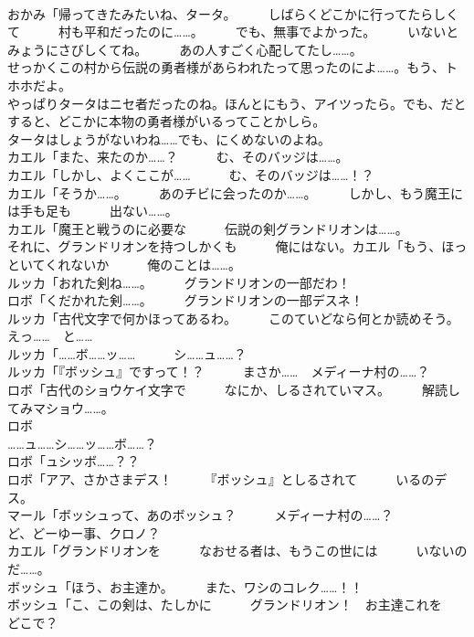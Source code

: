 \documentclass[8pt]{extreport}
\begin{document}
\begin{CJK}{UTF8}{min}
\\	おかみ「帰ってきたみたいね、タータ。　　　しばらくどこかに行ってたらしくて　　　村も平和だったのに……。　　　でも、無事でよかった。　　　いないとみょうにさびしくてね。　　　あの人すごく心配してたし……。	
\\	せっかくこの村から伝説の勇者様があらわれたって思ったのによ……。もう、トホホだよ。	
\\	やっぱりタータはニセ者だったのね。ほんとにもう、アイツったら。でも、だとすると、どこかに本物の勇者様がいるってことかしら。	
\\	タータはしょうがないわね……でも、にくめないのよね。	
\\	カエル「また、来たのか……？　　　む、そのバッジは……。	
\\	カエル「しかし、よくここが……　　　む、そのバッジは……！？	
\\	カエル「そうか……。　　　あのチビに会ったのか……。　　　しかし、もう魔王には手も足も　　　出ない……。	
\\	カエル「魔王と戦うのに必要な　　　伝説の剣グランドリオンは……。	
\\	それに、グランドリオンを持つしかくも　　　俺にはない。カエル「もう、ほっといてくれないか　　　俺のことは……。	
\\	ルッカ「おれた剣ね……。　　　グランドリオンの一部だわ！	
\\	ロボ「くだかれた剣……。　　　グランドリオンの一部デスネ！	
\\	ルッカ「古代文字で何かほってあるわ。　　　このていどなら何とか読めそう。　　　えっ……　と……	
\\	ルッカ「……ボ……ッ……　　　シ……ュ……？	
\\	ルッカ「『ボッシュ』ですって！？　　　まさか……　メディーナ村の……？	
\\	ロボ「古代のショウケイ文字で　　　なにか、しるされていマス。　　　解読してみマショウ……。	
\\	ロボ
\\	……ュ……シ……ッ……ボ……？	
\\	ロボ「ュシッボ……？？	
\\	ロボ「アア、さかさまデス！　　　『ボッシュ』としるされて　　　いるのデス。	
\\	マール「ボッシュって、あのボッシュ？　　　メディーナ村の……？	
\\	ど、どーゆー事、クロノ？	
\\	カエル「グランドリオンを　　　なおせる者は、もうこの世には　　　いないのだ……。	
\\	ボッシュ「ほう、お主達か。　　　また、ワシのコレク……！！	
\\	ボッシュ「こ、この剣は、たしかに　　　グランドリオン！　お主達これを　　　どこで？	

\end{CJK}
\end{document}
